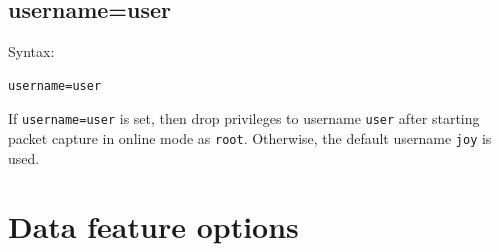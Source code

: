 \documentclass{book}
\begin{document}
\subsection{username=user}
\label{username}
\begin{mdframed}[style=aaa]
Syntax:
  \begin{verbatim}
username=user           
  \end{verbatim}
\end{mdframed}
If \texttt{username=user} is set, then drop privileges to username
\texttt{user} after starting packet capture in online mode as
\texttt{root}.  Otherwise, the default username \texttt{joy} is used.



\section{Data feature options}
\label{dataopts}

\end{document}
